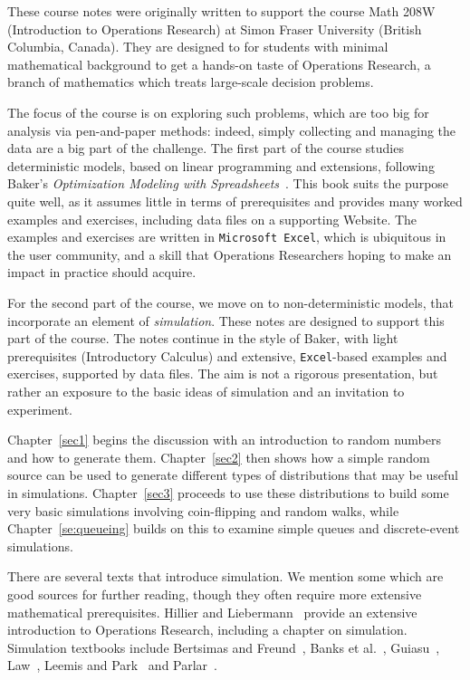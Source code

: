 These course notes were originally written to support the course
Math 208W (Introduction to Operations Research) at Simon Fraser University
(British Columbia, Canada).
They are designed to for students with minimal mathematical background to get a hands-on
taste of Operations Research, a branch of mathematics which treats large-scale decision problems.

The focus of the course is on exploring such problems, which are too big for
analysis via pen-and-paper methods: indeed, simply collecting and managing
the data are a big part of the challenge.  The first part of the course
studies deterministic models, based on linear programming and extensions,
following Baker's \emph{Optimization Modeling with Spreadsheets}~\cite{baker2015}.  
This book suits the purpose quite well, as it assumes little in terms of prerequisites
and provides many worked examples and exercises, including data files on a supporting Website.  
The examples and exercises are written in \texttt{Microsoft Excel}, which is ubiquitous in the user
community, and a skill that Operations Researchers hoping to make an impact in practice should acquire.

For the second part of the course, we move on to non-deterministic models,
that incorporate an element of \emph{simulation}.  These notes are designed to
support this part of the course.
The notes continue in the style of Baker, with light 
prerequisites (Introductory Calculus) and extensive, \texttt{Excel}-based examples
and exercises, supported by data files.  The aim is not a rigorous presentation,
but rather an exposure to the basic ideas of simulation and an invitation to experiment.  

\vspace{4mm}
Chapter~\ref{sec1} begins the discussion with an introduction to random numbers
and how to generate them.  Chapter~\ref{sec2} then shows how a simple random
source can be used to generate different types of distributions that may be
useful in simulations.  Chapter~\ref{sec3} proceeds to use these distributions
to build some very basic simulations involving coin-flipping and random walks,
while Chapter~\ref{se:queueing} builds on this to examine simple queues and 
discrete-event simulations.  

\vspace{4mm}
There are several texts that introduce simulation.  We mention some which are
good sources for further reading, though they often require more extensive
mathematical prerequisites.  Hillier and Liebermann~\cite{hl2010} provide an
extensive introduction to Operations Research, including a chapter on
simulation.  Simulation textbooks include Bertsimas and Freund~\cite{bf2004},
Banks et al.~\cite{banks2010}, Guiasu~\cite{guiasu2009}, Law~\cite{law2015},
Leemis and Park~\cite{leemis2006} and Parlar~\cite{parlar2000}.


